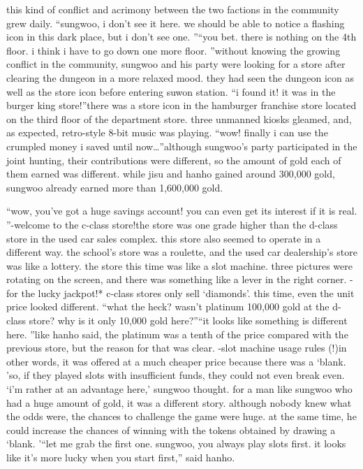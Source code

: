  this kind of conflict and acrimony between the two factions in the community grew daily.
“sungwoo, i don’t see it here.
 we should be able to notice a flashing icon in this dark place, but i don’t see one.
”“you bet.
 there is nothing on the 4th floor.
 i think i have to go down one more floor.
”without knowing the growing conflict in the community, sungwoo and his party were looking for a store after clearing the dungeon in a more relaxed mood.
 they had seen the dungeon icon as well as the store icon before entering suwon station.
“i found it! it was in the burger king store!”there was a store icon in the hamburger franchise store located on the third floor of the department store.
three unmanned kiosks gleamed, and, as expected, retro-style 8-bit music was playing.
“wow! finally i can use the crumpled money i saved until now…”although sungwoo’s party participated in the joint hunting, their contributions were different, so the amount of gold each of them earned was different.
while jisu and hanho gained around 300,000 gold, sungwoo already earned more than 1,600,000 gold.


“wow, you’ve got a huge savings account! you can even get its interest if it is real.
”-welcome to the c-class store!the store was one grade higher than the d-class store in the used car sales complex.
 this store also seemed to operate in a different way.
the school’s store was a roulette, and the used car dealership’s store was like a lottery.
the store this time was like a slot machine.
three pictures were rotating on the screen, and there was something like a lever in the right corner.
-for the lucky jackpot!* c-class stores only sell ‘diamonds’.
this time, even the unit price looked different.
“what the heck? wasn’t platinum 100,000 gold at the d-class store? why is it only 10,000 gold here?”“it looks like something is different here.
”like hanho said, the platinum was a tenth of the price compared with the previous store, but the reason for that was clear.
-slot machine usage rules (!)in other words, it was offered at a much cheaper price because there was a ‘blank.
’so, if they played slots with insufficient funds, they could not even break even.
‘i’m rather at an advantage here,’ sungwoo thought.
for a man like sungwoo who had a huge amount of gold, it was a different story.
although nobody knew what the odds were, the chances to challenge the game were huge.
at the same time, he could increase the chances of winning with the tokens obtained by drawing a ‘blank.
’“let me grab the first one.
 sungwoo, you always play slots first.
 it looks like it’s more lucky when you start first,” said hanho.


 